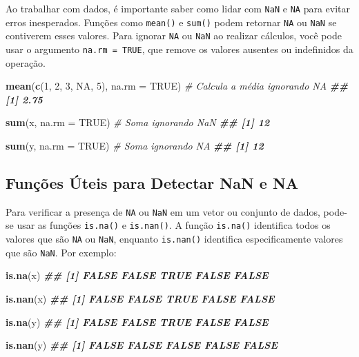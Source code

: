 \documentclass[
]{book}
\newenvironment{Shaded}{\begin{snugshade}}{\end{snugshade}}
\newcommand{\AttributeTok}[1]{\textcolor[rgb]{0.13,0.29,0.53}{#1}}
\newcommand{\CommentTok}[1]{\textcolor[rgb]{0.56,0.35,0.01}{\textit{#1}}}
\newcommand{\ConstantTok}[1]{\textcolor[rgb]{0.56,0.35,0.01}{#1}}
\newcommand{\DecValTok}[1]{\textcolor[rgb]{0.00,0.00,0.81}{#1}}
\newcommand{\DocumentationTok}[1]{\textcolor[rgb]{0.56,0.35,0.01}{\textbf{\textit{#1}}}}
\newcommand{\FunctionTok}[1]{\textcolor[rgb]{0.13,0.29,0.53}{\textbf{#1}}}
\newcommand{\NormalTok}[1]{#1}
\begin{document}
Ao trabalhar com dados, é importante saber como lidar com \texttt{NaN} e \texttt{NA}
para evitar erros inesperados. Funções como \texttt{mean()} e \texttt{sum()} podem
retornar \texttt{NA} ou \texttt{NaN} se contiverem esses valores. Para ignorar \texttt{NA} ou
\texttt{NaN} ao realizar cálculos, você pode usar o argumento \texttt{na.rm\ =\ TRUE},
que remove os valores ausentes ou indefinidos da operação.

\begin{Shaded}
\begin{Highlighting}[]
\FunctionTok{mean}\NormalTok{(}\FunctionTok{c}\NormalTok{(}\DecValTok{1}\NormalTok{, }\DecValTok{2}\NormalTok{, }\DecValTok{3}\NormalTok{, }\ConstantTok{NA}\NormalTok{, }\DecValTok{5}\NormalTok{), }\AttributeTok{na.rm =} \ConstantTok{TRUE}\NormalTok{)  }\CommentTok{\# Calcula a média ignorando NA}
\DocumentationTok{\#\# [1] 2.75}

\FunctionTok{sum}\NormalTok{(x, }\AttributeTok{na.rm =} \ConstantTok{TRUE}\NormalTok{)  }\CommentTok{\# Soma ignorando NaN}
\DocumentationTok{\#\# [1] 12}

\FunctionTok{sum}\NormalTok{(y, }\AttributeTok{na.rm =} \ConstantTok{TRUE}\NormalTok{)  }\CommentTok{\# Soma ignorando NA}
\DocumentationTok{\#\# [1] 12}
\end{Highlighting}
\end{Shaded}

\subsection{Funções Úteis para Detectar NaN e NA}\label{funuxe7uxf5es-uxfateis-para-detectar-nan-e-na}

Para verificar a presença de \texttt{NA} ou \texttt{NaN} em um vetor ou conjunto de
dados, pode-se usar as funções \texttt{is.na()} e \texttt{is.nan()}. A função
\texttt{is.na()} identifica todos os valores que são \texttt{NA} ou \texttt{NaN}, enquanto
\texttt{is.nan()} identifica especificamente valores que são \texttt{NaN}. Por
exemplo:

\begin{Shaded}
\begin{Highlighting}[]
\FunctionTok{is.na}\NormalTok{(x)}
\DocumentationTok{\#\# [1] FALSE FALSE  TRUE FALSE FALSE}

\FunctionTok{is.nan}\NormalTok{(x) }
\DocumentationTok{\#\# [1] FALSE FALSE  TRUE FALSE FALSE}

\FunctionTok{is.na}\NormalTok{(y)}
\DocumentationTok{\#\# [1] FALSE FALSE  TRUE FALSE FALSE}

\FunctionTok{is.nan}\NormalTok{(y)}
\DocumentationTok{\#\# [1] FALSE FALSE FALSE FALSE FALSE}
\end{Highlighting}
\end{Shaded}
\end{document}
